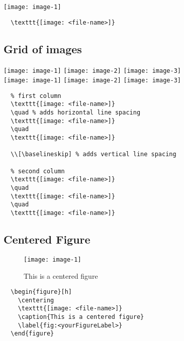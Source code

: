 \texttt{[image: image-1]}

\begin{lstlisting}
  \texttt{[image: <file-name>]}
\end{lstlisting}

\clearpage
\subsection{Grid of images}

\texttt{[image: image-1]}
\quad
\texttt{[image: image-2]}
\quad
\texttt{[image: image-3]}
\\[\baselineskip]%
\texttt{[image: image-1]}
\quad
\texttt{[image: image-2]}
\quad
\texttt{[image: image-3]}

\begin{lstlisting}
  % first column
  \texttt{[image: <file-name>]}
  \quad % adds horizontal line spacing
  \texttt{[image: <file-name>]}
  \quad
  \texttt{[image: <file-name>]}

  \\[\baselineskip] % adds vertical line spacing

  % second column
  \texttt{[image: <file-name>]}
  \quad
  \texttt{[image: <file-name>]}
  \quad
  \texttt{[image: <file-name>]}
\end{lstlisting}

\clearpage
\subsection{Centered Figure}

\begin{figure}[h]
  \centering
  \texttt{[image: image-1]}
  \caption{This is a centered figure}
  \label{fig:centeredFigure}
\end{figure}

\begin{lstlisting}
  \begin{figure}[h]
    \centering
    \texttt{[image: <file-name>]}
    \caption{This is a centered figure}
    \label{fig:<yourFigureLabel>}
  \end{figure}
\end{lstlisting}

